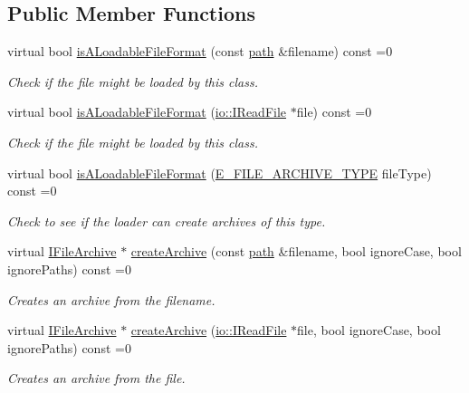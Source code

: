 \subsection*{Public Member Functions}
\begin{DoxyCompactItemize}
\item 
virtual bool \hyperlink{classirr_1_1io_1_1IArchiveLoader_a9e1f6da1913c595347c731f691cae004}{is\+A\+Loadable\+File\+Format} (const \hyperlink{namespaceirr_1_1io_ab1bdc45edb3f94d8319c02bc0f840ee1}{path} \&filename) const  =0
\begin{DoxyCompactList}\small\item\em Check if the file might be loaded by this class. \end{DoxyCompactList}\item 
virtual bool \hyperlink{classirr_1_1io_1_1IArchiveLoader_a3cb29e4f60789e1d658e7ac7a2e0861d}{is\+A\+Loadable\+File\+Format} (\hyperlink{classirr_1_1io_1_1IReadFile}{io\+::\+I\+Read\+File} $\ast$file) const  =0
\begin{DoxyCompactList}\small\item\em Check if the file might be loaded by this class. \end{DoxyCompactList}\item 
virtual bool \hyperlink{classirr_1_1io_1_1IArchiveLoader_a208afadf81b882ba1c430ce54edda06e}{is\+A\+Loadable\+File\+Format} (\hyperlink{namespaceirr_1_1io_adb3e3c445ec8e608ed1f0f93306da14f}{E\+\_\+\+F\+I\+L\+E\+\_\+\+A\+R\+C\+H\+I\+V\+E\+\_\+\+T\+Y\+PE} file\+Type) const  =0
\begin{DoxyCompactList}\small\item\em Check to see if the loader can create archives of this type. \end{DoxyCompactList}\item 
virtual \hyperlink{classirr_1_1io_1_1IFileArchive}{I\+File\+Archive} $\ast$ \hyperlink{classirr_1_1io_1_1IArchiveLoader_a528c9c775506607e2bfc6d37f3b40875}{create\+Archive} (const \hyperlink{namespaceirr_1_1io_ab1bdc45edb3f94d8319c02bc0f840ee1}{path} \&filename, bool ignore\+Case, bool ignore\+Paths) const  =0
\begin{DoxyCompactList}\small\item\em Creates an archive from the filename. \end{DoxyCompactList}\item 
virtual \hyperlink{classirr_1_1io_1_1IFileArchive}{I\+File\+Archive} $\ast$ \hyperlink{classirr_1_1io_1_1IArchiveLoader_ad8d1903f130a5b40916e25a174bd55ec}{create\+Archive} (\hyperlink{classirr_1_1io_1_1IReadFile}{io\+::\+I\+Read\+File} $\ast$file, bool ignore\+Case, bool ignore\+Paths) const  =0
\begin{DoxyCompactList}\small\item\em Creates an archive from the file. \end{DoxyCompactList}\end{DoxyCompactItemize}
